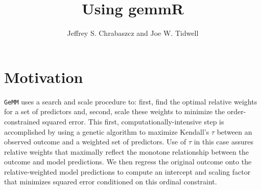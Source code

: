 \documentclass{article}\usepackage[]{graphicx}\usepackage[]{color}
\title{Using gemmR}
\author{Jeffrey S. Chrabaszcz and Joe W. Tidwell}
\begin{document}
\maketitle

\section*{Motivation}




\texttt{GeMM} uses a search and scale procedure to: first, find the optimal relative weights for a set of predictors and, second, scale these weights to minimize the order-constrained squared error.
This first, computationally-intensive step is accomplished by using a genetic algorithm to maximize Kendall's $\tau$ between an observed outcome and a weighted set of predictors.
Use of $\tau$ in this case assures relative weights that maximally reflect the monotone relationship between the outcome and model predictions.
We then regress the original outcome onto the relative-weighted model predictions to compute an intercept and scaling factor that minimizes squared error conditioned on this ordinal constraint.

\end{document}

